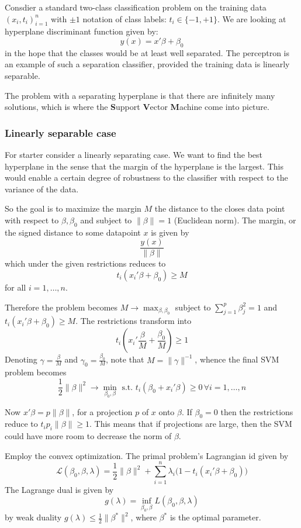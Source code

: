 \documentclass[a4paper]{article}
\newcommand{\Lcal}{\mathcal{L}}
\begin{document}
Consdier a standard two-class classification problem on the training data
$(x_i,t_i)_{i=1}^n$ with $\pm1$ notation of class labels: $t_i\in\{-1,+1\}$.
We are looking at hyperplane discriminant function given by:
\[y(x) = x'\beta + \beta_0\]
in the hope that the classes would be at least well separated.
The perceptron is an example of such a separation classifier, provided the 
training data is linearly separable.

The problem with a separating hyperplane is that there are infinitely many
solutions, which is where the \textbf{S}upport \textbf{V}ector \textbf{M}achine
come into picture.

\subsubsection{Linearly separable case} %
\label{ssub:linearly_separable_case}

For starter consider a linearly separating case. We want to find the best hyperplane
in the sense that the margin of the hyperplane is the largest. This would enable a
certain degree of robustness to the classifier with respect to the variance of
the data.

So the goal is to maximize the margin $M$ the distance to the closes data point
with respect to $\beta,\beta_0$ and subject to $\|\beta\|=1$ (Euclidean norm).
The margin, or the signed distance to some datapoint $x$ is given by
\[ \frac{y(x)}{\|\beta\|} \]
which under the given restrictions reduces to
\[ t_i(x_i'\beta + \beta_0) \geq M \]
for all $i=1,\ldots,n$.

Therefore the problem becomes $ M \to \max_{\beta, \beta_0}$ subject to
$\sum_{j=1}^p \beta_j^2 = 1$ and $t_i( x_i'\beta+\beta_0 )\geq M$.
The restrictions transform into
\[ t_i( x_i'\frac{\beta}{M}+\frac{\beta_0}{M} )\geq 1 \]
Denoting $\gamma = \frac{\beta}{M}$ and $\gamma_0 = \frac{\beta_0}{M}$,
note that $M = \|\gamma\|^{-1}$, whence the final SVM problem becomes
\[
\frac{1}{2}\|\beta\|^2 \to \min_{\beta_0,\beta}
\text{ s.t. }
t_i(\beta_0+x_i'\beta)\geq 0\,\forall i=1,\ldots,n
\]

Now $x'\beta = p\|\beta\|$, for a projection $p$ of $x$ onto $\beta$. If $\beta_0=0$
then the restrictions reduce to $t_i p_i\|\beta\|\geq 1$. This means that if projections
are large, then the SVM could have more room to decrease the norm of $\beta$.

Employ the convex optimization. The primal problem's Lagrangian id given by
\[
\Lcal(\beta_0, \beta, \lambda)
= \frac{1}{2} \|\beta\|^2 + \sum_{i=1}^n \lambda_i \bigl(1 - t_i(x_i'\beta+\beta_0) \bigr)
\]
The Lagrange dual is given by
\[
g(\lambda) = \inf_{\beta_0,\beta} L(\beta_0, \beta, \lambda)
\]
by weak duality $g(\lambda)\leq \frac{1}{2}\|\beta^*\|^2$, where $\beta^*$ is the
optimal parameter.
\end{document}
